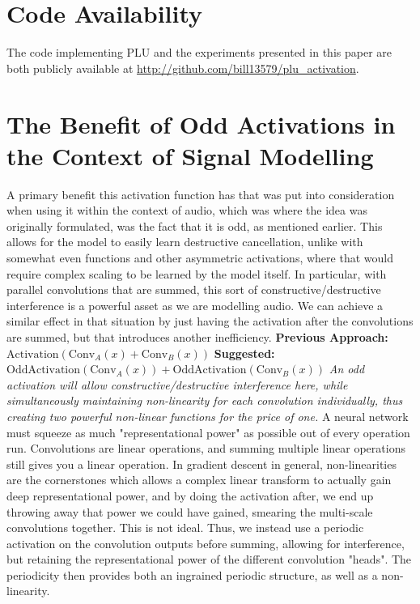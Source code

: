 \documentclass[11pt, letterpaper]{article}
\begin{document}
\section*{Code Availability}

The code implementing PLU and the experiments presented in this paper are both publicly available at \url{http://github.com/bill13579/plu_activation}.




\appendix
\section{The Benefit of Odd Activations in the Context of Signal Modelling}

A primary benefit this activation function has that was put into consideration when using it within the context of audio, which was where the idea was originally formulated, was the fact that it is odd, as mentioned earlier. This allows for the model to easily learn destructive cancellation, unlike with somewhat even functions and other asymmetric activations, where that would require complex scaling to be learned by the model itself. In particular, with parallel convolutions that are summed, this sort of constructive/destructive interference is a powerful asset as we are modelling audio. We can achieve a similar effect in that situation by just having the activation after the convolutions are summed, but that introduces another inefficiency.
\newline\newline
\textbf{Previous Approach:} $\text{Activation}(\text{Conv}_A(x) + \text{Conv}_B(x))$
\newline\newline
\textbf{Suggested:} $\text{OddActivation}(\text{Conv}_A(x)) + \text{OddActivation}(\text{Conv}_B(x))$
\newline\newline
\textit{An odd activation will allow constructive/destructive interference here, while simultaneously maintaining non-linearity for each convolution individually, thus creating two powerful non-linear functions for the price of one.}
\newline\newline
A neural network must squeeze as much "representational power" as possible out of every operation run. Convolutions are linear operations, and summing multiple linear operations still gives you a linear operation. In gradient descent in general, non-linearities are the cornerstones which allows a complex linear transform to actually gain deep representational power, and by doing the activation after, we end up throwing away that power we could have gained, smearing the multi-scale convolutions together. This is not ideal. Thus, we instead use a periodic activation on the convolution outputs before summing, allowing for interference, but retaining the representational power of the different convolution "heads". The periodicity then provides both an ingrained periodic structure, as well as a non-linearity.
\end{document}
